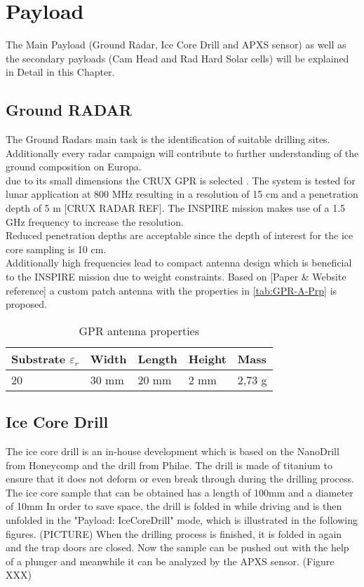 
\chapter{Payload}
\label{chap:payload}

The Main Payload (Ground Radar, Ice Core Drill and APXS sensor) as well as the secondary payloads (Cam Head and Rad Hard Solar cells) will be explained in Detail in this Chapter.

\section{Ground RADAR}
The Ground Radars main task is the identification of suitable drilling sites. Additionally every radar campaign will contribute to further understanding of the ground composition on Europa.\\

due to its small dimensions the CRUX GPR is selected . The system is tested for lunar application at 800 MHz resulting in a resolution of 15 cm and a penetration depth of 5 m [CRUX RADAR REF]. The INSPIRE mission makes use of a 1.5 GHz frequency to increase the resolution. \\
Reduced penetration depths are acceptable since the depth of interest for the ice core sampling is 10 cm. \\

Additionally high frequencies lead to compact antenna design which is beneficial to the INSPIRE mission due to weight constraints. 
Based on [Paper \& Website reference] a custom patch antenna with the properties in \autoref{tab:GPR-A-Prp} is proposed.

\begin{table}[h]
\centering
\begin{tabular}{lllll}
Substrate ${\varepsilon}_{r}$ & Width & Length & Height & Mass   \\ \hline\hline
20                         & 30 mm & 20 mm  & 2 mm   & 2,73 g  \\ \hline
\end{tabular}
\caption{GPR antenna properties}
\label{tab:GPR-A-Prp}
\end{table}

\section{Ice Core Drill}

The ice core drill is an in-house development which is based on the NanoDrill from Honeycomp and the drill from Philae. The drill is made of titanium to ensure that it does not deform or even break through during the drilling process.
The ice core sample that can be obtained has a length of 100mm and a diameter of 10mm
In order to save space, the drill is folded in while driving and is then unfolded in the "Payload: IceCoreDrill" mode, which is illustrated in the following figures. (PICTURE)
When the drilling process is finished, it is folded in again and the trap doors are closed.
Now the sample can be pushed out with the help of a plunger and meanwhile it can be analyzed by the APXS sensor. (Figure XXX)


